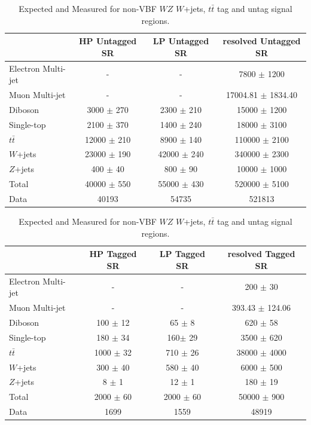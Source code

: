 \begin{table}
\begin{tabular}{|l|c|c|c|}
\hline
	  &	 HP Untagged SR &	 LP Untagged SR &	resolved Untagged SR \\\hline 
	Electron Multi-jet &	- &	- &	7800 $\pm$ 1200 \\\hline 
	Muon Multi-jet &	- &	- &	17004.81 $\pm$ 1834.40 \\\hline 
	Diboson &	3000 $\pm$ 270 &	2300 $\pm$ 210 &	15000 $\pm$ 1200 \\\hline 
	Single-top &	2100 $\pm$ 370 &	1400 $\pm$ 240 &	18000 $\pm$ 3100\\\hline 
	$t\bar{t}$ &	12000 $\pm$ 210 &	8900 $\pm$ 140 &	110000 $\pm$ 2100 \\\hline 
	$W$+jets &	23000 $\pm$ 190&	42000 $\pm$ 240 &	340000 $\pm$ 2300 \\\hline 
	$Z$+jets &	400 $\pm$ 40 &	800 $\pm$ 90 &	10000 $\pm$ 1000 \\\hline 
	Total &	40000 $\pm$ 550 &	55000 $\pm$ 430 &	520000 $\pm$ 5100 \\\hline 
	Data &	40193 &	54735 &	521813 \\\hline 
\end{tabular}

\begin{tabular}{|l|c|c|c|}
\hline
	  &	 HP Tagged SR &	 LP Tagged SR &	resolved Tagged SR \\\hline 
	Electron Multi-jet &	- &	- &	200 $\pm$ 30 \\\hline 
	Muon Multi-jet &	- &	- &	393.43 $\pm$ 124.06 \\\hline 
	Diboson &	100 $\pm$ 12 &	65 $\pm$ 8 &	620 $\pm$ 58 \\\hline 
	Single-top &	180 $\pm$ 34 &	160$\pm$ 29 &	3500 $\pm$ 620 \\\hline 
	$t\bar{t}$ &	1000 $\pm$ 32 &	710 $\pm$ 26 &	38000 $\pm$ 4000 \\\hline 
	$W$+jets &	300 $\pm$ 40 &	580 $\pm$ 40 &	6000 $\pm$ 500 \\\hline 
	$Z$+jets &	8 $\pm$ 1 &	12 $\pm$ 1 &	180 $\pm$ 19 \\\hline 
	Total &	2000 $\pm$ 60 &	2000 $\pm$ 60 &	50000 $\pm$ 900 \\\hline 
	Data &	1699 &	1559 &	48919 \\\hline 
\end{tabular}
\caption{Expected and Measured for non-VBF $WZ$ $W$+jets, $t\bar{t}$ tag and untag signal regions.}
\label{tbl:hvtwz_yields_tcr}
\end{table}

